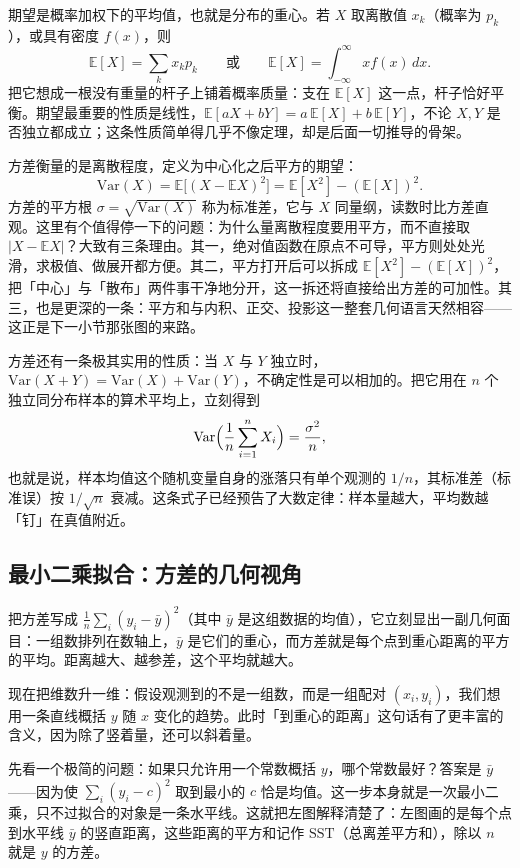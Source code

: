 \documentclass[UTF8]{ctexbook}
\begin{document}
期望是概率加权下的平均值，也就是分布的重心。若 $X$ 取离散值 $x_k$（概率为 $p_k$），或具有密度 $f(x)$，则
\[
\mathbb{E}[X]=\sum_k x_k p_k
\qquad\text{或}\qquad
\mathbb{E}[X]=\int_{-\infty}^{\infty}x f(x)\,dx .
\]
把它想成一根没有重量的杆子上铺着概率质量：支在 $\mathbb{E}[X]$ 这一点，杆子恰好平衡。期望最重要的性质是线性，$\mathbb{E}[aX+bY]=a\,\mathbb{E}[X]+b\,\mathbb{E}[Y]$，不论 $X,Y$ 是否独立都成立；这条性质简单得几乎不像定理，却是后面一切推导的骨架。

方差衡量的是离散程度，定义为中心化之后平方的期望：
\[
\mathrm{Var}(X)=\mathbb{E}\bigl[(X-\mathbb{E}X)^2\bigr]
=\mathbb{E}[X^2]-(\mathbb{E}[X])^2.
\]
方差的平方根 $\sigma=\sqrt{\mathrm{Var}(X)}$ 称为标准差，它与 $X$ 同量纲，读数时比方差直观。这里有个值得停一下的问题：为什么量离散程度要用平方，而不直接取 $|X-\mathbb{E}X|$？大致有三条理由。其一，绝对值函数在原点不可导，平方则处处光滑，求极值、做展开都方便。其二，平方打开后可以拆成 $\mathbb{E}[X^2]-(\mathbb{E}[X])^2$，把「中心」与「散布」两件事干净地分开，这一拆还将直接给出方差的可加性。其三，也是更深的一条：平方和与内积、正交、投影这一整套几何语言天然相容——这正是下一小节那张图的来路。

方差还有一条极其实用的性质：当 $X$ 与 $Y$ 独立时，$\mathrm{Var}(X+Y)=\mathrm{Var}(X)+\mathrm{Var}(Y)$，不确定性是可以相加的。把它用在 $n$ 个独立同分布样本的算术平均上，立刻得到
\[
\mathrm{Var}\Bigl(\frac{1}{n}\sum_{i=1}^n X_i\Bigr)=\frac{\sigma^2}{n},
\]
也就是说，样本均值这个随机变量自身的涨落只有单个观测的 $1/n$，其标准差（标准误）按 $1/\sqrt n$ 衰减。这条式子已经预告了大数定律：样本量越大，平均数越「钉」在真值附近。

\subsection{最小二乘拟合：方差的几何视角}

把方差写成 $\frac1n\sum_i (y_i-\bar y)^2$（其中 $\bar y$ 是这组数据的均值），它立刻显出一副几何面目：一组数排列在数轴上，$\bar y$ 是它们的重心，而方差就是每个点到重心距离的平方的平均。距离越大、越参差，这个平均就越大。

现在把维数升一维：假设观测到的不是一组数，而是一组配对 $(x_i,y_i)$，我们想用一条直线概括 $y$ 随 $x$ 变化的趋势。此时「到重心的距离」这句话有了更丰富的含义，因为除了竖着量，还可以斜着量。

先看一个极简的问题：如果只允许用一个常数概括 $y$，哪个常数最好？答案是 $\bar y$——因为使 $\sum_i(y_i-c)^2$ 取到最小的 $c$ 恰是均值。这一步本身就是一次最小二乘，只不过拟合的对象是一条水平线。这就把左图解释清楚了：左图画的是每个点到水平线 $\bar y$ 的竖直距离，这些距离的平方和记作 $\mathrm{SST}$（总离差平方和），除以 $n$ 就是 $y$ 的方差。
\end{document}
